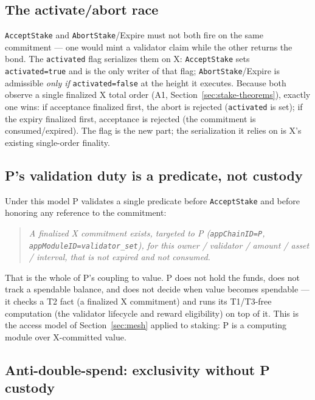 \subsection{The activate/abort race}
\label{sec:activate-race}

\texttt{AcceptStake} and \texttt{AbortStake}/Expire must not both fire on
the same commitment --- one would mint a validator claim while the other
returns the bond. The \texttt{activated} flag serializes them on X:
\texttt{AcceptStake} sets \texttt{activated=true} and is the only writer
of that flag; \texttt{AbortStake}/Expire is admissible \emph{only if}
\texttt{activated=false} at the height it executes. Because both observe
a single finalized X total order (A1, Section~\ref{sec:stake-theorems}),
exactly one wins: if acceptance finalized first, the abort is rejected
(\texttt{activated} is set); if the expiry finalized first, acceptance is
rejected (the commitment is consumed/expired). \DESIGN{} The flag is the
new part; the serialization it relies on is X's existing single-order
finality.

\subsection{P's validation duty is a predicate, not custody}

Under this model P validates a single predicate before
\texttt{AcceptStake} and before honoring any reference to the commitment:

\begin{quote}
\emph{A finalized X commitment exists, targeted to P
(\texttt{appChainID=P}, \texttt{appModuleID=validator\_set}), for this
owner / validator / amount / asset / interval, that is not expired and
not consumed.}
\end{quote}

\noindent That is the whole of P's coupling to value. P does not hold
the funds, does not track a spendable balance, and does not decide when
value becomes spendable --- it checks a T2 fact (a finalized X
commitment) and runs its T1/T3-free computation (the validator
lifecycle and reward eligibility) on top of it. This is the access model
of Section~\ref{sec:mesh} applied to staking: P is a computing module
over X-committed value.

\subsection{Anti-double-spend: exclusivity without P custody}
\label{sec:stake-exclusivity}

